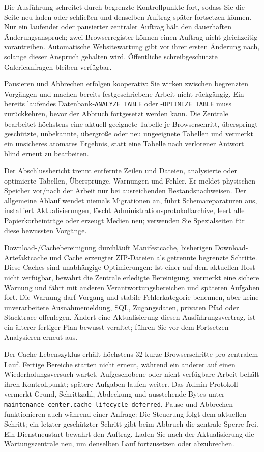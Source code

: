 \documentclass[11pt,a4paper]{article}
\newcommand{\codeword}[1]{\nolinkurl{#1}}
\begin{document}
Die Ausführung schreitet durch begrenzte Kontrollpunkte fort, sodass Sie die
Seite neu laden oder schließen und denselben Auftrag später fortsetzen können.
Nur ein laufender oder pausierter zentraler Auftrag hält den dauerhaften
Änderungsanspruch; zwei Browserregister können einen Auftrag nicht gleichzeitig
vorantreiben. Automatische Websitewartung gibt vor ihrer ersten Änderung nach,
solange dieser Anspruch gehalten wird. Öffentliche schreibgeschützte
Galerieanfragen bleiben verfügbar.

Pausieren und Abbrechen erfolgen kooperativ: Sie wirken zwischen begrenzten
Vorgängen und machen bereits festgeschriebene Arbeit nicht rückgängig. Ein
bereits laufendes Datenbank-\codeword{ANALYZE TABLE} oder
-\codeword{OPTIMIZE TABLE} muss zurückkehren, bevor der Abbruch fortgesetzt
werden kann. Die Zentrale bearbeitet höchstens eine aktuell geeignete Tabelle je
Browserschritt, überspringt geschützte, unbekannte, übergroße oder neu
ungeeignete Tabellen und vermerkt ein unsicheres atomares Ergebnis, statt eine
Tabelle nach verlorener Antwort blind erneut zu bearbeiten.

Der Abschlussbericht trennt entfernte Zeilen und Dateien, analysierte oder
optimierte Tabellen, Übersprünge, Warnungen und Fehler. Er meldet physischen
Speicher vor/nach der Arbeit nur bei ausreichenden Bestandsnachweisen. Der
allgemeine Ablauf wendet niemals Migrationen an, führt Schemareparaturen aus,
installiert Aktualisierungen, löscht Administrationsprotokollarchive, leert alle
Papierkorbeinträge oder erzeugt Medien neu; verwenden Sie Spezialseiten für
diese bewussten Vorgänge.

Download-/Cachebereinigung durchläuft Manifestcache, bisherigen
Download-Artefaktcache und Cache erzeugter ZIP-Dateien als getrennte begrenzte
Schritte. Diese Caches sind unabhängige Optimierungen: Ist einer auf dem
aktuellen Host nicht verfügbar, bewahrt die Zentrale erledigte Bereinigung,
vermerkt eine sichere Warnung und fährt mit anderen Verantwortungsbereichen und
späteren Aufgaben fort. Die Warnung darf Vorgang und stabile Fehlerkategorie
benennen, aber keine unverarbeitete Ausnahmemeldung, SQL, Zugangsdaten, privaten
Pfad oder Stacktrace offenlegen. Ändert eine Aktualisierung diesen
Ausführungsvertrag, ist ein älterer fertiger Plan bewusst veraltet; führen Sie
vor dem Fortsetzen Analysieren erneut aus.

Der Cache-Lebenszyklus erhält höchstens 32 kurze Browserschritte pro zentralem
Lauf. Fertige Bereiche starten nicht erneut, während ein anderer auf einen
Wiederholungsversuch wartet. Aufgeschobene oder nicht verfügbare Arbeit behält
ihren Kontrollpunkt; spätere Aufgaben laufen weiter. Das Admin-Protokoll
vermerkt Grund, Schrittzahl, Abdeckung und ausstehende Bytes unter
\codeword{maintenance\_center.cache\_lifecycle\_deferred}.
Pause und Abbrechen funktionieren auch während einer Anfrage: Die Steuerung
folgt dem aktuellen Schritt; ein letzter geschützter Schritt gibt beim Abbruch
die zentrale Sperre frei. Ein Dienstneustart bewahrt den Auftrag. Laden Sie
nach der Aktualisierung die Wartungszentrale neu, um denselben Lauf
fortzusetzen oder abzubrechen.
\end{document}

